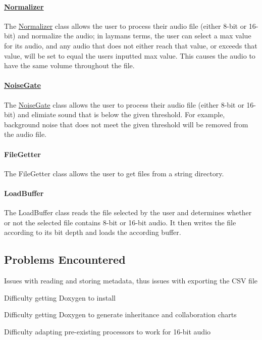\paragraph*{\hyperlink{classNormalizer}{Normalizer}}

The {\ttfamily \hyperlink{classNormalizer}{Normalizer}} class allows the user to process their audio file (either 8-\/bit or 16-\/bit) and normalize the audio; in layman\textquotesingle{}s terms, the user can select a max value for its audio, and any audio that does not either reach that value, or exceeds that value, will be set to equal the user\textquotesingle{}s inputted max value. This causes the audio to have the same volume throughout the file.

\paragraph*{\hyperlink{classNoiseGate}{Noise\+Gate}}

The {\ttfamily \hyperlink{classNoiseGate}{Noise\+Gate}} class allows the user to process their audio file (either 8-\/bit or 16-\/bit) and elimiate sound that is below the given threshold. For example, background noise that does not meet the given threshold will be removed from the audio file.

\paragraph*{File\+Getter}

The {\ttfamily File\+Getter} class allows the user to get files from a string directory.

\paragraph*{Load\+Buffer}

The {\ttfamily Load\+Buffer} class reads the file selected by the user and determines whether or not the selected file contains 8-\/bit or 16-\/bit audio. It then writes the file according to its bit depth and loads the according buffer.

\subsection*{Problems Encountered}


\begin{DoxyItemize}
\item Issues with reading and storing metadata, thus issues with exporting the C\+SV file
\item Difficulty getting Doxygen to install
\item Difficulty getting Doxygen to generate inheritance and collaboration charts
\item Difficulty adapting pre-\/existing processors to work for 16-\/bit audio 
\end{DoxyItemize}